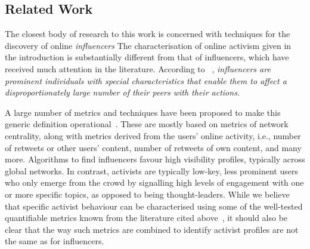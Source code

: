 \documentclass[runningheads]{llncs}
\begin{document}
\subsection{Related Work}

The closest body of research to this work is concerned with techniques for the discovery of online \textit{influencers} 
The characterisation of online activism given in the introduction is substantially different from that of influencers, which have received much attention in the literature.
According to ~\cite{Kardara2015}, \textit{influencers are prominent individuals with special characteristics that enable them to	affect a disproportionately large number of their peers with their actions.}

A large number of metrics and techniques have been proposed to make this generic definition operational~\cite{RIQUELME2016949}. These are mostly based on metrics of network centrality, along with metrics derived from the users' online activity, i.e., number of retweets or other users' content, number of retweets of own content, and many more. 
%
Algorithms to find influencers favour high visibility profiles, typically across global networks.
In contrast, activists are typically low-key, less prominent users who only emerge from the crowd by signalling high levels of engagement with one or more specific topics, as opposed to being thought-leaders. 
%
While we believe that specific activist behaviour can be characterised using some of the well-tested quantifiable metrics known from the literature cited above~\cite{RIQUELME2016949}, it should also be clear that the way such metrics are combined to identify activist profiles are not the same as for influencers. 


\\
	
\\
\end{document}
